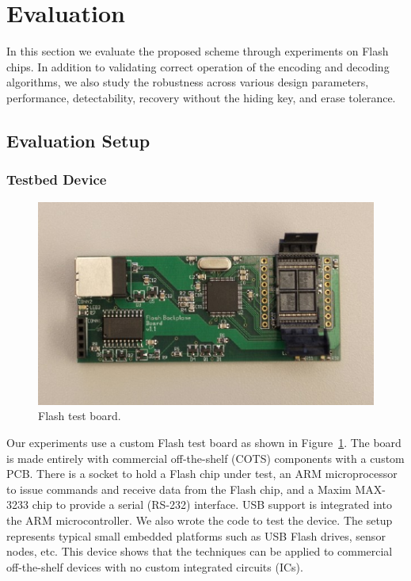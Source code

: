 \section{Evaluation}
\label{sec:evaluation}

In this section we evaluate the proposed scheme through experiments on 
Flash chips. In addition to validating correct operation of the 
encoding and decoding algorithms, we also study the robustness across 
various design parameters, performance, detectability, recovery 
without the hiding key, and erase tolerance.

\subsection{Evaluation Setup}

\subsubsection{Testbed Device}

\begin{figure}
\begin{center} 
\includegraphics[width=\mywidth]{figs/flashtestboard.pdf} 
\caption{Flash test board.}
\label{fig:flashtestboard} 
\vspace{-0.1in}
\end{center} 
\end{figure} 

Our experiments use a custom Flash test board as shown in 
Figure~\ref{fig:flashtestboard}. The board is made entirely with 
commercial off-the-shelf (COTS) components with a custom PCB. 
There is a socket to hold a Flash chip under test, an ARM 
microprocessor to issue commands and receive data from the Flash 
chip, and a Maxim MAX-3233 chip to provide a serial (RS-232) 
interface. USB support is integrated into the ARM microcontroller. 
We also wrote the code to test the device. The setup represents 
typical small embedded platforms such as USB Flash drives, sensor 
nodes, etc. This device shows that the techniques can be applied 
to commercial off-the-shelf devices with no custom integrated 
circuits (ICs).

